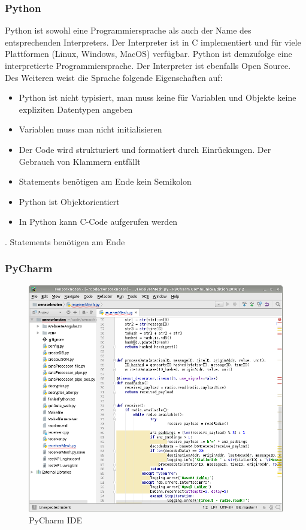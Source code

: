 \subsubsection{Python}
Python ist sowohl eine Programmiersprache als auch der Name des entsprechenden Interpreters. Der Interpreter ist in C implementiert und für viele Plattformen (Linux, Windows, MacOS) verfügbar. Python ist demzufolge eine interpretierte Programmiersprache. Der Interpreter ist ebenfalls Open Source. Des Weiteren weist die Sprache folgende Eigenschaften auf:

\begin{itemize}
\item Python ist nicht typisiert, man muss keine für Variablen und Objekte keine expliziten Datentypen angeben
\item Variablen muss man nicht initialisieren
\item Der Code wird strukturiert und formatiert durch Einrückungen. Der Gebrauch von Klammern entfällt
\item Statements benötigen am Ende kein Semikolon
\item Python ist Objektorientiert
\item In Python kann C-Code aufgerufen werden
\end{itemize} . Statements benötigen am Ende 



\cite{python}


\subsubsection{PyCharm} 
\begin{figure}
\includegraphics[scale=0.5]{bilder/pycharm} 
\caption{PyCharm IDE}
\label{PyCharm}
\end{figure}
  
